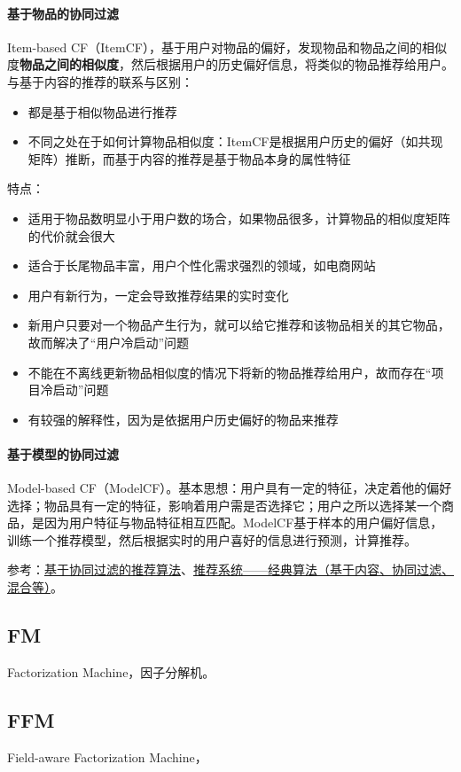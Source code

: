 \paragraph{基于物品的协同过滤}
Item-based CF（ItemCF），基于用户对物品的偏好，发现物品和物品之间的相似度\textbf{物品之间的相似度}，然后根据用户的历史偏好信息，将类似的物品推荐给用户。与基于内容的推荐的联系与区别：
\begin{itemize}
	\item 都是基于相似物品进行推荐
	\item 不同之处在于如何计算物品相似度：ItemCF是根据用户历史的偏好（如共现矩阵）推断，而基于内容的推荐是基于物品本身的属性特征
\end{itemize}
特点：
\begin{itemize}
	\item 适用于物品数明显小于用户数的场合，如果物品很多，计算物品的相似度矩阵的代价就会很大
	\item 适合于长尾物品丰富，用户个性化需求强烈的领域，如电商网站
	\item 用户有新行为，一定会导致推荐结果的实时变化
	\item 新用户只要对一个物品产生行为，就可以给它推荐和该物品相关的其它物品，故而解决了“用户冷启动”问题
	\item 不能在不离线更新物品相似度的情况下将新的物品推荐给用户，故而存在“项目冷启动”问题
	\item 有较强的解释性，因为是依据用户历史偏好的物品来推荐
\end{itemize}


\paragraph{基于模型的协同过滤}
Model-based CF（ModelCF）。基本思想：用户具有一定的特征，决定着他的偏好选择；物品具有一定的特征，影响着用户需是否选择它；用户之所以选择某一个商品，是因为用户特征与物品特征相互匹配。ModelCF基于样本的用户偏好信息，训练一个推荐模型，然后根据实时的用户喜好的信息进行预测，计算推荐。

参考：\href{https://www.cnblogs.com/shengyang17/p/11516532.html}{基于协同过滤的推荐算法}、\href{https://zhuanlan.zhihu.com/p/108759393}{推荐系统——经典算法（基于内容、协同过滤、混合等）}。




\subsection{FM}
Factorization Machine，因子分解机。

\subsection{FFM}
Field-aware Factorization Machine，